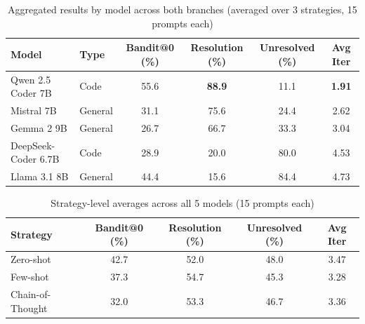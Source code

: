 \documentclass[11pt,a4paper]{article}
\begin{document}
\begin{table}[h]
\centering
\caption{Aggregated results by model across both branches (averaged over 3 strategies, 15 prompts each)}
\begin{tabular}{llcccc}
\toprule
\textbf{Model} & \textbf{Type} & \textbf{Bandit@0 (\%)} & \textbf{Resolution (\%)} & \textbf{Unresolved (\%)} & \textbf{Avg Iter} \\
\midrule
Qwen 2.5 Coder 7B   & Code    & 55.6 & \textbf{88.9} & 11.1 & \textbf{1.91} \\
Mistral 7B          & General & 31.1 & 75.6          & 24.4 & 2.62          \\
Gemma 2 9B          & General & 26.7 & 66.7          & 33.3 & 3.04          \\
DeepSeek-Coder 6.7B & Code    & 28.9 & 20.0          & 80.0 & 4.53          \\
Llama 3.1 8B        & General & 44.4 & 15.6          & 84.4 & 4.73          \\
\bottomrule
\end{tabular}
\label{tab:model_summary}
\end{table}

\begin{table}[h]
\centering
\caption{Strategy-level averages across all 5 models (15 prompts each)}
\begin{tabular}{lcccc}
\toprule
\textbf{Strategy} & \textbf{Bandit@0 (\%)} & \textbf{Resolution (\%)} & \textbf{Unresolved (\%)} & \textbf{Avg Iter} \\
\midrule
Zero-shot        & 42.7 & 52.0 & 48.0 & 3.47 \\
Few-shot         & 37.3 & 54.7 & 45.3 & 3.28 \\
Chain-of-Thought & 32.0 & 53.3 & 46.7 & 3.36 \\
\bottomrule
\end{tabular}
\label{tab:strategy_summary}
\end{table}
\end{document}
